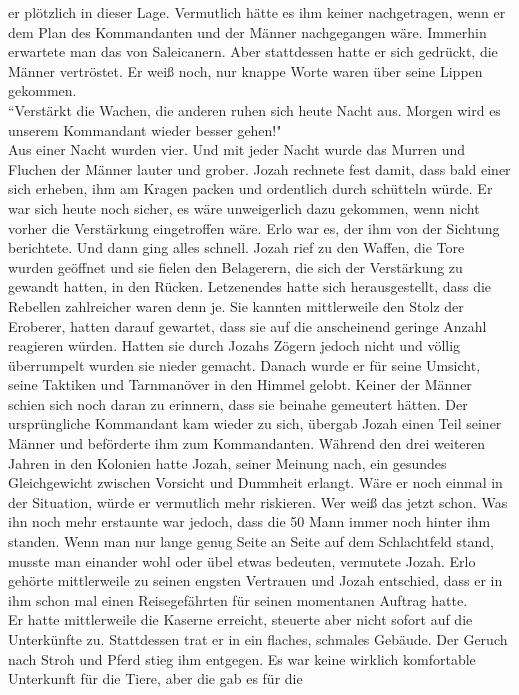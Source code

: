 er plötzlich in dieser Lage. Vermutlich hätte es ihm keiner nachgetragen, wenn er dem Plan des 
Kommandanten und der Männer nachgegangen wäre. Immerhin erwartete man das von Saleicanern. Aber 
stattdessen hatte er sich gedrückt, die Männer vertröstet. Er weiß noch, nur knappe Worte waren über 
seine Lippen gekommen. \\  ``Verstärkt die Wachen, die anderen ruhen sich heute Nacht aus. Morgen 
wird es unserem Kommandant wieder besser gehen!"\\
Aus einer Nacht wurden vier. Und mit jeder Nacht wurde das Murren und Fluchen der Männer lauter und 
grober. Jozah rechnete fest damit, dass bald einer sich erheben, ihm am Kragen packen und 
ordentlich durch schütteln würde. Er war sich heute noch sicher, es wäre unweigerlich dazu 
gekommen, wenn nicht vorher die Verstärkung eingetroffen wäre. Erlo war es, der ihm von der 
Sichtung berichtete. Und dann ging alles schnell. Jozah rief zu den Waffen, die Tore wurden geöffnet 
und sie fielen den Belagerern, die sich der Verstärkung zu gewandt hatten, in den Rücken. 
Letzenendes hatte sich herausgestellt, dass die Rebellen zahlreicher waren denn je. Sie kannten 
mittlerweile den Stolz der Eroberer, hatten darauf gewartet, dass sie auf die anscheinend geringe 
Anzahl reagieren würden. Hatten sie durch Jozahs Zögern jedoch nicht und völlig überrumpelt wurden 
sie nieder gemacht. Danach wurde er für seine Umsicht, seine Taktiken und Tarnmanöver in den Himmel 
gelobt. Keiner der Männer schien sich noch daran zu erinnern, dass sie beinahe gemeutert hätten. Der 
ursprüngliche Kommandant kam wieder zu sich, übergab Jozah einen Teil seiner Männer und beförderte 
ihm zum Kommandanten. Während den drei weiteren Jahren in den Kolonien hatte Jozah, seiner Meinung 
nach, ein gesundes Gleichgewicht zwischen Vorsicht und Dummheit erlangt. Wäre er noch einmal in der 
Situation, würde er vermutlich mehr riskieren. Wer weiß das jetzt schon. Was ihn noch mehr erstaunte 
war jedoch, dass die 50 Mann immer noch hinter ihm standen. Wenn man nur lange genug Seite an Seite 
auf dem Schlachtfeld stand, musste man einander wohl oder übel etwas bedeuten, vermutete Jozah. 
Erlo gehörte mittlerweile zu seinen engsten Vertrauen und Jozah entschied, dass er in ihm schon mal 
einen Reisegefährten für seinen momentanen Auftrag hatte. \\
Er hatte mittlerweile die Kaserne erreicht, steuerte aber nicht sofort auf die Unterkünfte zu. 
Stattdessen trat er in ein flaches, schmales Gebäude. Der Geruch nach Stroh und Pferd stieg ihm 
entgegen. Es war keine wirklich komfortable Unterkunft für die Tiere, aber die gab es für die 

